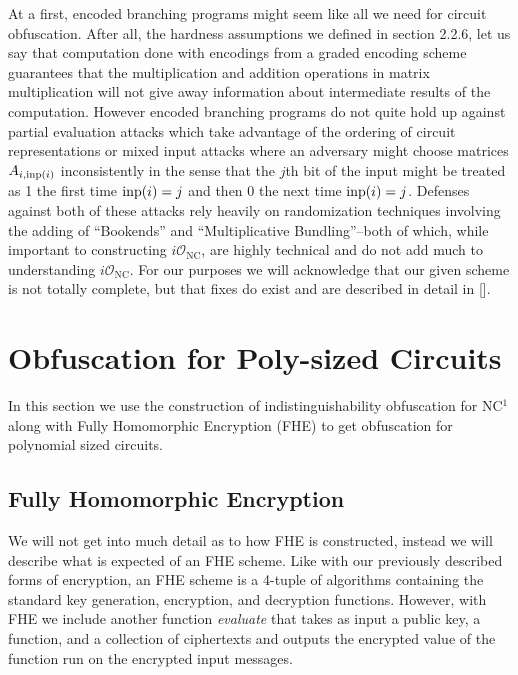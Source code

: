 \documentclass[12pt,twoside]{reedthesis}
\begin{document}
    \par At a first, encoded branching programs might seem like all we need for circuit obfuscation. After all, the hardness assumptions we defined in section 2.2.6, let us say that computation done with encodings from a graded encoding scheme guarantees that the multiplication and addition operations in matrix multiplication will not give away information about intermediate results of the computation. However encoded branching programs do not quite hold up against partial evaluation attacks which take advantage of the ordering of circuit representations or mixed input attacks where an adversary might choose matrices $A_{i,\text{inp}(i)}$ inconsistently in the sense that the $j$th bit of the input might be treated as 1 the first time $\text{inp}(i)=j$ and then 0 the next time $\text{inp}(i) = j$. Defenses against both of these attacks rely heavily on randomization techniques involving the adding of ``Bookends'' and ``Multiplicative Bundling''--both of which, while important to constructing $i\mathcal{O}_\text{NC}$, are highly technical and do not add much to understanding $i\mathcal{O}_\text{NC}$. For our purposes we will acknowledge that our given scheme is not totally complete, but that fixes do exist and are described in detail in [\cite{Garg:2013}].
    
    
   
     
   
    
    \section{Obfuscation for Poly-sized Circuits}
    In this section we use the construction of indistinguishability obfuscation for NC$^1$ along with Fully Homomorphic Encryption (FHE) to get obfuscation for polynomial sized circuits.
    
    \subsection{Fully Homomorphic Encryption}
    We will not get into much detail as to how FHE is constructed, instead we will describe what is expected of an FHE scheme. Like with our previously described forms of encryption, an FHE scheme is a 4-tuple of algorithms containing the standard key generation, encryption, and decryption functions. However, with FHE we include another function \textit{evaluate} that takes as input a public key, a function, and a collection of ciphertexts and outputs the encrypted value of the function run on the encrypted input messages. 
    
\end{document}
